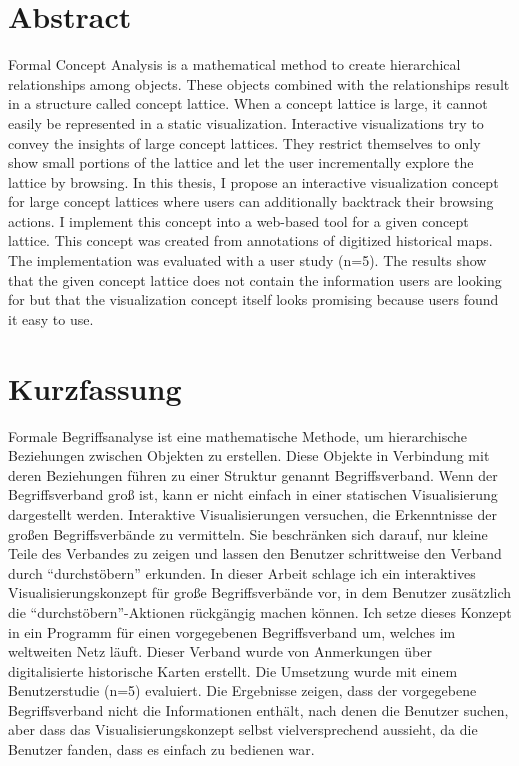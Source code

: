 \documentclass[11pt]{report}
\begin{document}


\renewcommand{\thepage}{\roman{page}}%

\newpage
\thispagestyle{empty}
\mbox{}

\chapter*{Abstract}
Formal Concept Analysis is a mathematical method to create hierarchical relationships among objects. These objects combined with the relationships result in a structure called concept lattice. When a concept lattice is large, it cannot easily be represented in a static visualization. Interactive visualizations try to convey the insights of large concept lattices. They restrict themselves to only show small portions of the lattice and let the user incrementally explore the lattice by browsing. In this thesis, I propose an interactive visualization concept for large concept lattices where users can additionally backtrack their browsing actions. I implement this concept into a web-based tool for a given concept lattice. This concept was created from annotations of digitized historical maps. The implementation was evaluated with a user study (n=5). The results show that the given concept lattice does not contain the information users are looking for but that the visualization concept itself looks promising because users found it easy to use.

\newpage
\thispagestyle{empty}
\mbox{}

\chapter*{Kurzfassung}

Formale Begriffsanalyse ist eine mathematische Methode, um hierarchische Beziehungen zwischen Objekten zu erstellen. Diese Objekte in Verbindung mit deren Beziehungen führen zu einer Struktur genannt Begriffsverband. Wenn der Begriffsverband groß ist, kann er nicht einfach in einer statischen Visualisierung dargestellt werden. Interaktive Visualisierungen versuchen, die Erkenntnisse der großen Begriffsverbände zu vermitteln. Sie beschränken sich darauf, nur kleine Teile des Verbandes zu zeigen und lassen den Benutzer schrittweise den Verband durch ``durchstöbern'' erkunden. In dieser Arbeit schlage ich ein interaktives Visualisierungskonzept für große Begriffsverbände vor, in dem Benutzer zusätzlich die ``durchstöbern''-Aktionen rückgängig machen können. Ich setze dieses Konzept in ein Programm für einen vorgegebenen Begriffsverband um, welches im weltweiten Netz läuft. Dieser Verband wurde von Anmerkungen über digitalisierte historische Karten erstellt. Die Umsetzung wurde mit einem Benutzerstudie (n=5) evaluiert. Die Ergebnisse zeigen, dass der vorgegebene Begriffsverband nicht die Informationen enthält, nach denen die Benutzer suchen, aber dass das Visualisierungskonzept selbst vielversprechend aussieht, da die Benutzer fanden, dass es einfach zu bedienen war.
\end{document}
